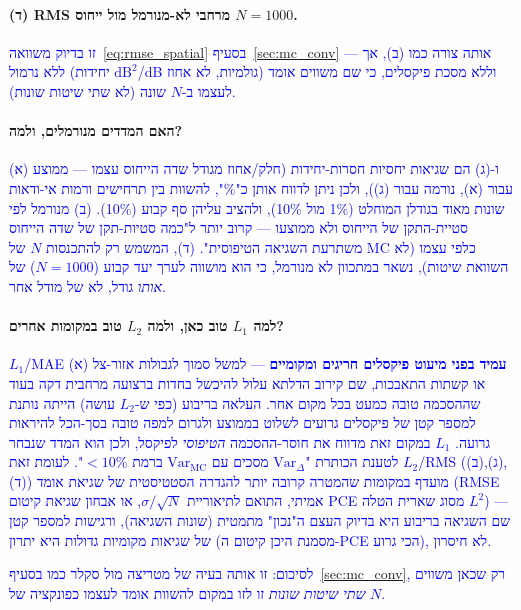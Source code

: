 \documentclass[12pt,a4paper]{article}
\newcommand{\Var}{\mathrm{Var}}
\DeclareRobustCommand{\aiedit}[1]{\textcolor{blue}{#1}}
\begin{document}
\paragraph{(ד) \textenglish{RMS} מרחבי לא-מנורמל מול ייחוס $N=1000$.}
\aiedit{זו בדיוק
משוואה~\ref{eq:rmse_spatial} בסעיף~\ref{sec:mc_conv} — אותה צורה כמו (ב), אך ללא נרמול (יחידות
$\text{dB}^2$/dB גולמיות, לא אחוז) וללא מסכת פיקסלים, כי שם משווים אומד לעצמו ב-$N$ שונה
(לא שתי שיטות שונות).}

\paragraph{האם המדדים מנורמלים, ולמה?}
\aiedit{(א) ו-(ג) הם שגיאות יחסיות חסרות-יחידות (חלק/אחוז
מגודל שדה הייחוס עצמו — ממוצע עבור (א), נורמה עבור (ג)), ולכן ניתן לדווח אותן כ"$\%{}$",
להשוות בין תרחישים ורמות אי-ודאות שונות מאוד בגודלן המוחלט (1\%{} מול 10\%{}), ולהציב
עליהן סף קבוע (10\%{}). (ב) מנורמל לפי סטיית-התקן של הייחוס ולא ממוצעו — קרוב יותר ל"כמה
סטיות-תקן של שדה הייחוס משתרעת השגיאה הטיפוסית". (ד), המשמש רק להתכנסות $N$ של MC כלפי עצמו
(לא השוואת שיטות), נשאר במתכוון לא מנורמל, כי הוא מושווה לערך יעד קבוע ($N=1000$) של \emph{אותו}
גודל, לא של מודל אחר.}

\paragraph{למה $L_1$ טוב כאן, ולמה $L_2$ טוב במקומות אחרים?}
\aiedit{$L_1$/\textenglish{MAE} (א) \textbf{עמיד
בפני מיעוט פיקסלים חריגים ומקומיים} — למשל סמוך לגבולות אזור-צל או קשתות התאבכות, שם קירוב
הדלתא עלול להיכשל בחדות ברצועה מרחבית דקה בעוד שההסכמה טובה כמעט בכל מקום אחר. העלאה בריבוע
(כפי ש-$L_2$ עושה) הייתה נותנת למספר קטן של פיקסלים גרועים לשלוט בממוצע ולגרום למפה טובה בסך-הכל
להיראות גרועה. $L_1$ במקום זאת מדווח את חוסר-ההסכמה \emph{הטיפוסי} לפיקסל, ולכן הוא המדד שנבחר
לטענת הכותרת "$\Var_\Delta$ מסכים עם $\Var_{\mathrm{MC}}$ ברמת $<10\%{}$". לעומת זאת $L_2$/\textenglish{RMS}
((ב),(ג),(ד)) מועדף במקומות שהמטרה קרובה יותר להגדרה הסטטיסטית של שגיאת אומד (RMSE אמיתי,
התואם לתיאוריית $\sigma/\sqrt N$, או אבחון שגיאת קיטום \textenglish{PCE} מסוג שארית הטלה
$L^2$) — שם השגיאה בריבוע היא בדיוק העצם ה"נכון" מתמטית (שונות השגיאה), ורגישות למספר קטן של
שגיאות מקומיות גדולות היא יתרון (מסמנת היכן קיטום ה-\textenglish{PCE} הכי גרוע), לא חיסרון.}

\aiedit{לסיכום: זו אותה בעיה של מטריצה מול סקלר כמו בסעיף~\ref{sec:mc_conv}, רק שכאן משווים \emph{שתי
שיטות שונות} זו לזו במקום להשוות אומד לעצמו כפונקציה של $N$.}
\end{document}

